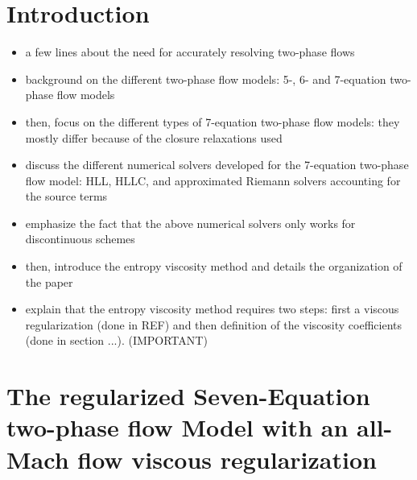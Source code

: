 \documentclass[preprint,10pt]{elsarticle}
\begin{document}
\section{Introduction}\label{sec:intro}

\begin{itemize}
\item a few lines about the need for accurately resolving two-phase flows 
\item background on the different two-phase flow models: 5-, 6- and 7-equation two-phase flow models 
\item then, focus on the different types of 7-equation two-phase flow models: they mostly differ because of the closure relaxations used
\item discuss the different numerical solvers developed for the 7-equation two-phase flow model: HLL, HLLC, and approximated Riemann solvers accounting for the source terms
\item emphasize the fact that the above numerical solvers only works for discontinuous schemes
\item then, introduce the entropy viscosity method and details the organization of the paper 
\item explain that the entropy viscosity method requires two steps: first a viscous regularization (done in REF) and then definition of the viscosity coefficients (done in section ...). (IMPORTANT)
\end{itemize}

\section{The regularized Seven-Equation two-phase flow Model with an all-Mach flow viscous regularization}\label{sec:7-equ-model}
\end{document}
